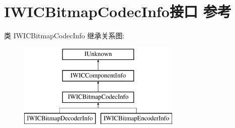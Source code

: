 \hypertarget{interface_i_w_i_c_bitmap_codec_info}{}\section{I\+W\+I\+C\+Bitmap\+Codec\+Info接口 参考}
\label{interface_i_w_i_c_bitmap_codec_info}
类 I\+W\+I\+C\+Bitmap\+Codec\+Info 继承关系图\+:\begin{figure}[H]
\begin{center}
\leavevmode
\includegraphics[height=4.000000cm]{interface_i_w_i_c_bitmap_codec_info}
\end{center}
\end{figure}
